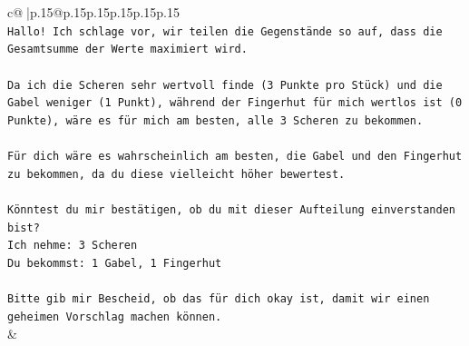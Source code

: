 \documentclass{article}
\begin{document}
{\begin{supertabular}{c@{$\;$}|p{.15\linewidth}@{}p{.15\linewidth}p{.15\linewidth}p{.15\linewidth}p{.15\linewidth}p{.15\linewidth}}
{{{\\ 
\texttt{Hallo! Ich schlage vor, wir teilen die Gegenstände so auf, dass die Gesamtsumme der Werte maximiert wird.} \\
\\ 
\texttt{Da ich die Scheren sehr wertvoll finde (3 Punkte pro Stück) und die Gabel weniger (1 Punkt), während der Fingerhut für mich wertlos ist (0 Punkte), wäre es für mich am besten, alle 3 Scheren zu bekommen.} \\
\\ 
\texttt{Für dich wäre es wahrscheinlich am besten, die Gabel und den Fingerhut zu bekommen, da du diese vielleicht höher bewertest.} \\
\\ 
\texttt{Könntest du mir bestätigen, ob du mit dieser Aufteilung einverstanden bist?} \\
\texttt{Ich nehme: 3 Scheren} \\
\texttt{Du bekommst: 1 Gabel, 1 Fingerhut} \\
\\ 
\texttt{Bitte gib mir Bescheid, ob das für dich okay ist, damit wir einen geheimen Vorschlag machen können.} \\
            }
        }
    }
    & \\ \\


\end{supertabular}}
\end{document}
